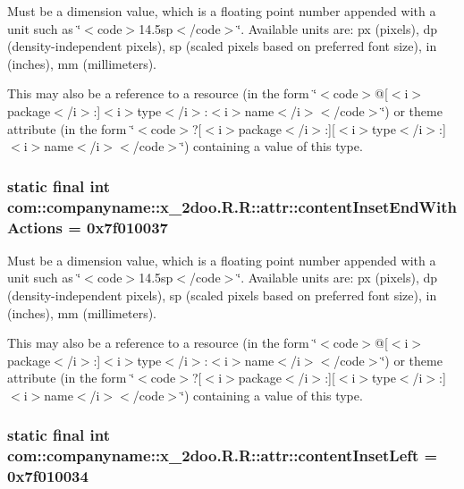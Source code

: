 Must be a dimension value, which is a floating point number appended with a unit such as \char`\"{}$<$code$>$14.5sp$<$/code$>$\char`\"{}. Available units are: px (pixels), dp (density-independent pixels), sp (scaled pixels based on preferred font size), in (inches), mm (millimeters). 

This may also be a reference to a resource (in the form \char`\"{}$<$code$>$@\mbox{[}$<$i$>$package$<$/i$>$:\mbox{]}$<$i$>$type$<$/i$>$:$<$i$>$name$<$/i$>$$<$/code$>$\char`\"{}) or theme attribute (in the form \char`\"{}$<$code$>$?\mbox{[}$<$i$>$package$<$/i$>$:\mbox{]}\mbox{[}$<$i$>$type$<$/i$>$:\mbox{]}$<$i$>$name$<$/i$>$$<$/code$>$\char`\"{}) containing a value of this type. \hypertarget{classcom_1_1companyname_1_1x__2doo_1_1_r_1_1attr_af3871d51ee2abdd46db1ee09223225a}{
\subsubsection[{contentInsetEndWithActions}]{\setlength{\rightskip}{0pt plus 5cm}static final int com::companyname::x\_\-2doo.R.R::attr::contentInsetEndWithActions = 0x7f010037}}
\label{classcom_1_1companyname_1_1x__2doo_1_1_r_1_1attr_af3871d51ee2abdd46db1ee09223225a}


Must be a dimension value, which is a floating point number appended with a unit such as \char`\"{}$<$code$>$14.5sp$<$/code$>$\char`\"{}. Available units are: px (pixels), dp (density-independent pixels), sp (scaled pixels based on preferred font size), in (inches), mm (millimeters). 

This may also be a reference to a resource (in the form \char`\"{}$<$code$>$@\mbox{[}$<$i$>$package$<$/i$>$:\mbox{]}$<$i$>$type$<$/i$>$:$<$i$>$name$<$/i$>$$<$/code$>$\char`\"{}) or theme attribute (in the form \char`\"{}$<$code$>$?\mbox{[}$<$i$>$package$<$/i$>$:\mbox{]}\mbox{[}$<$i$>$type$<$/i$>$:\mbox{]}$<$i$>$name$<$/i$>$$<$/code$>$\char`\"{}) containing a value of this type. \hypertarget{classcom_1_1companyname_1_1x__2doo_1_1_r_1_1attr_6c3ee0e73b74ea9e227ad51936654195}{
\subsubsection[{contentInsetLeft}]{\setlength{\rightskip}{0pt plus 5cm}static final int com::companyname::x\_\-2doo.R.R::attr::contentInsetLeft = 0x7f010034}}
\label{classcom_1_1companyname_1_1x__2doo_1_1_r_1_1attr_6c3ee0e73b74ea9e227ad51936654195}


